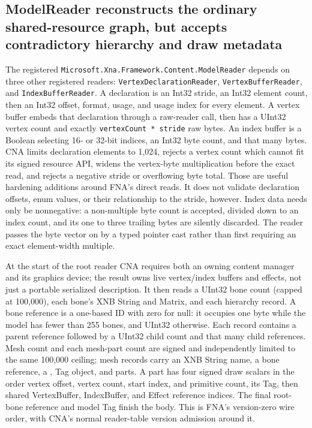 \subsection{ModelReader reconstructs the ordinary shared-resource graph, but accepts contradictory hierarchy and draw metadata}
\label{sec:xnb-model-reader-contract}

The registered \texttt{Microsoft.Xna.Framework.Content.ModelReader} depends on three other
registered readers: \texttt{VertexDeclarationReader}, \texttt{VertexBufferReader}, and
\texttt{IndexBufferReader}.  A declaration is an Int32 stride, an Int32 element count, then an
Int32 offset, format, usage, and usage index for every element.  A vertex buffer embeds that
declaration through a raw-reader call, then has a UInt32 vertex count and exactly
\texttt{vertexCount * stride} raw bytes.  An index buffer is a Boolean selecting 16- or 32-bit
indices, an Int32 byte count, and that many bytes.  CNA limits declaration elements to 1,024,
rejects a vertex count which cannot fit its signed resource API, widens the vertex-byte
multiplication before the exact read, and rejects a negative stride or overflowing byte total.
Those are useful hardening additions around FNA's direct reads.  It does not validate declaration
offsets, enum values, or their relationship to the stride, however.  Index data needs only be
nonnegative: a non-multiple byte count is accepted, divided down to an index count, and its one to
three trailing bytes are silently discarded.  The reader passes the byte vector on by a typed
pointer cast rather than first requiring an exact element-width multiple.

At the start of the root reader CNA requires both an owning content manager and its graphics
device; the result owns live vertex/index buffers and effects, not just a portable serialized
description.  It then reads a UInt32 bone count (capped at 100,000), each bone's XNB String and
Matrix, and each hierarchy record.  A bone reference is a one-based ID with zero for null: it
occupies one byte while the model has fewer than 255 bones, and UInt32
otherwise.  Each record contains a parent reference followed by a UInt32 child count and that
many child references.  Mesh count and each mesh-part count are signed and independently limited
to the same 100,000 ceiling; mesh records carry an XNB String name, a bone reference, a
, Tag object, and parts.  A part has four signed draw scalars in the
order vertex offset, vertex count, start index, and primitive count, its Tag, then shared
VertexBuffer, IndexBuffer, and Effect reference indices.  The final root-bone reference and
model Tag finish the body.  This is FNA's version-zero wire order, with CNA's normal reader-table
version admission around it.

